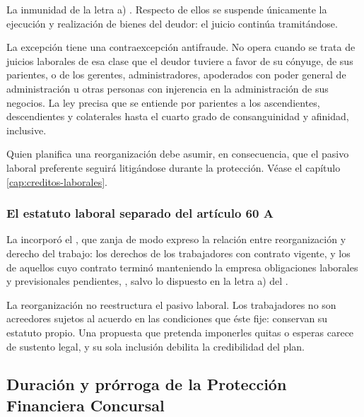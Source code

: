 \begin{alerta}
La inmunidad de la letra a) . Respecto de ellos se suspende únicamente la
ejecución y realización de bienes del deudor: el juicio continúa tramitándose.

La excepción tiene una contraexcepción antifraude. No opera cuando se trata de juicios
laborales de esa clase que el deudor tuviere a favor de su cónyuge, de sus parientes, o de
los gerentes, administradores, apoderados con poder general de administración u otras
personas con injerencia en la administración de sus negocios. La ley precisa que se entiende
por parientes a los ascendientes, descendientes y colaterales hasta el cuarto grado de
consanguinidad y afinidad, inclusive.

Quien planifica una reorganización debe asumir, en consecuencia, que el pasivo laboral
preferente seguirá litigándose durante la protección. Véase el capítulo
\ref{cap:creditos-laborales}.
\end{alerta}

\subsubsection{El estatuto laboral separado del artículo 60 A}

La \Lreforma{} \citeyearpar{ley-21563} incorporó el , que zanja de modo expreso la
relación entre reorganización y derecho del trabajo: los derechos de los trabajadores con
contrato vigente, y los de aquellos cuyo contrato terminó manteniendo la empresa
obligaciones laborales y previsionales pendientes, ,
salvo lo dispuesto en la letra a) del .

\begin{foco}
La reorganización no reestructura el pasivo laboral. Los trabajadores no son acreedores
sujetos al acuerdo en las condiciones que éste fije: conservan su estatuto propio. Una
propuesta que pretenda imponerles quitas o esperas carece de sustento legal, y su sola
inclusión debilita la credibilidad del plan.
\end{foco}

\subsection{Duración y prórroga de la Protección Financiera Concursal}

